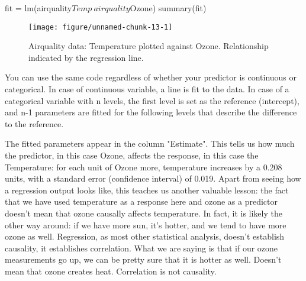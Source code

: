 \documentclass[a4paper,twoside]{tufte-book}\usepackage[]{graphicx}\usepackage[]{color}
\makeatletter
\def\maxwidth{ %
	\ifdim\Gin@nat@width>\linewidth
	\linewidth
	\else
	\Gin@nat@width
	\fi
}
\makeatother
\begin{document}
\begin{Schunk}
\begin{Sinput}
fit = lm(airquality$Temp~airquality$Ozone)
summary(fit)
\end{Sinput}
\end{Schunk}

\begin{figure}[htbp]
\begin{center}
\begin{Schunk}

\texttt{[image: figure/unnamed-chunk-13-1]} \end{Schunk}
\caption{Airquality data: Temperature plotted against Ozone. Relationship indicated by the regression line.}
\label{fig: LR}
\end{center}
\end{figure}

You can use the same code regardless of whether your predictor is continuous or categorical. In case of continuous variable, a line is fit to the data. In case of a categorical variable with n levels, the first level is set as the reference (intercept), and n-1 parameters are fitted for the following levels that describe the difference to the reference. 

The fitted parameters appear in the column "Estimate". This tells us how much the predictor, in this case Ozone, affects the response, in this case the Temperature: for each unit of Ozone more, temperature increases by a 0.208 units, with a standard error (confidence interval) of 0.019. Apart from seeing how a regression output looks like, this teaches us another valuable lesson: the fact that we have used temperature as a response here and ozone as a predictor doesn't mean that ozone causally affects temperature.  In fact, it is likely the other way around: if we have more sun, it's hotter, and we tend to have more ozone as well. Regression, as most other statistical analysis, doesn't establish causality, it establishes correlation. What we are saying is that if our ozone measurements go up, we can be pretty sure that it is hotter as well. Doesn't mean that ozone creates heat. Correlation is not causality. 
\end{document}
